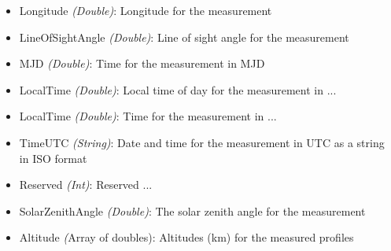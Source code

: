 \begin{itemize}
\begin{itemize}
            \item Longitude \emph{(Double)}: Longitude for the measurement
            \item LineOfSightAngle \emph{(Double)}: Line of sight angle for the
                measurement
            \item MJD \emph{(Double)}: Time for the measurement in MJD
            \item LocalTime \emph{(Double)}: Local time of day for the
                measurement in ... 
            \item LocalTime \emph{(Double)}: Time for the measurement in ...
            \item TimeUTC \emph{(String)}: Date and time for the measurement in
                UTC as a string in ISO format
            \item Reserved \emph{(Int)}: Reserved ... 
            \item SolarZenithAngle \emph{(Double)}: The solar zenith angle for
                the measurement
            \item Altitude \emph({Array of doubles}): Altitudes (km) for the
                measured profiles
        \end{itemize}
\end{itemize}




